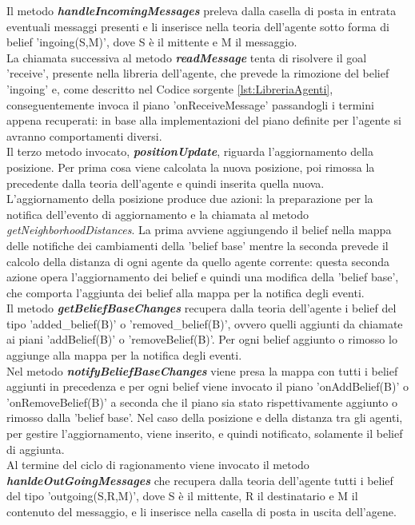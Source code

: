 \documentclass[12pt,a4paper,openright,twoside]{report}
\begin{document}
Il metodo \textbf{\textit{handleIncomingMessages}} preleva dalla casella di posta in entrata eventuali messaggi presenti e li inserisce nella teoria dell'agente sotto forma di belief 'ingoing(S,M)', dove S \`e il mittente e M il messaggio.
\\
La chiamata successiva al metodo \textbf{\textit{readMessage}} tenta di risolvere il goal 'receive', presente nella libreria dell'agente, che prevede la rimozione del belief 'ingoing' e, come descritto nel Codice sorgente \ref{lst:LibreriaAgenti}, conseguentemente invoca il piano 'onReceiveMessage' passandogli i termini appena recuperati: in base alla implementazioni del piano definite per l'agente si avranno comportamenti diversi.
\\
Il terzo metodo invocato, \textbf{\textit{positionUpdate}}, riguarda l'aggiornamento della posizione. Per prima cosa viene calcolata la nuova posizione, poi rimossa la precedente dalla teoria dell'agente e quindi inserita quella nuova. L'aggiornamento della posizione produce due azioni: la preparazione per la notifica dell'evento di aggiornamento e la chiamata al metodo \textit{getNeighborhoodDistances}. La prima avviene aggiungendo il belief nella mappa delle notifiche dei cambiamenti della 'belief base' mentre la seconda prevede il calcolo della distanza di ogni agente da quello agente corrente: questa seconda azione opera l'aggiornamento dei belief e quindi una modifica della 'belief base', che comporta l'aggiunta dei belief alla mappa per la notifica degli eventi.
\\
Il metodo \textbf{\textit{getBeliefBaseChanges}} recupera dalla teoria dell'agente i belief del tipo 'added\_belief(B)' o 'removed\_belief(B)', ovvero quelli aggiunti da chiamate ai piani 'addBelief(B)' o 'removeBelief(B)'. Per ogni belief aggiunto o rimosso lo aggiunge alla mappa per la notifica degli eventi.
\\
Nel metodo \textbf{\textit{notifyBeliefBaseChanges}} viene presa la mappa con tutti i belief aggiunti in precedenza e per ogni belief viene invocato il piano 'onAddBelief(B)' o 'onRemoveBelief(B)' a seconda che il piano sia stato rispettivamente aggiunto o rimosso dalla 'belief base'. Nel caso della posizione e della distanza tra gli agenti, per gestire l'aggiornamento, viene inserito, e quindi notificato, solamente il belief di aggiunta.
\\
Al termine del ciclo di ragionamento viene invocato il metodo \textbf{\textit{hanldeOutGoingMessages}} che recupera dalla teoria dell'agente tutti i belief del tipo 'outgoing(S,R,M)', dove S \`e il mittente, R il destinatario e M il contenuto del messaggio, e li inserisce nella casella di posta in uscita dell'agene.
\end{document}
